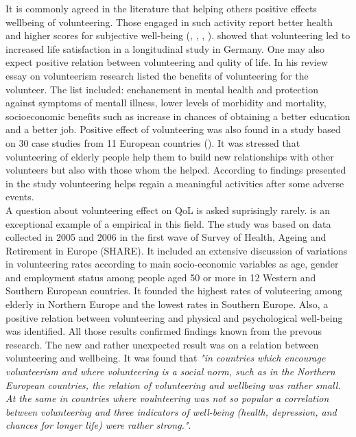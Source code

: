 \documentclass[10pt, letterpaper]{article}
\begin{document}
\begin{spacing}{1.4}
It is commonly agreed in the literature that helping others positive effects wellbeing of volunteering. Those engaged in such activity report better health and higher scores for subjective well-being (\citet{haski09}, \citet{morrow2003}, \citep{thoits03}, \citep{whillans2016}). \citep{meier08} showed that volunteering led to increased life satisfaction in a longitudinal study in Germany. One may also expect positive relation between volunteering and qulity of life.  In his review essay on volunteerism research \citet{wilson12} listed the benefits of volunteering for the volunteer. The list included: enchancment in mental health and protection against symptoms of mentall illness, lower levels of morbidity and mortality, socioeconomic benefits such as increase in chances of obtaining a better education and a better job. Positive effect of volunteering was also found in a study based on 30 case studies from 11 European countries (\citet{ehlers11}). It was stressed that volunteering of elderly people help them to build new relationships with other volunteers but also with those whom the helped. According to findings presented in the study volunteering helps regain a meaningful activities after some adverse events.   \\

A question about volunteering effect on QoL is asked suprisingly  rarely. \citet{haski09} is an exceptional example of a empirical in this field. The study was based on data collected in 2005 and 2006 in the first wave of Survey of Health, Ageing and Retirement in Europe (SHARE). It included an extensive discussion of variations in volunteering rates according to main socio-economic variables as age, gender and employment status among people aged 50 or more in 12 Western and Southern European countries. It founded  the highest rates of voluteering among elderly in Northern Europe and the lowest rates in Southern Europe. Also, a positive relation between volunteering and physical and psychological well-being was identified. All those results confirmed findings known from the prevous research. The new and rather unexpected result was on a relation between volunteering and wellbeing. It was found that \textit{"in countries which encourage volunteerism and where volunteering is a social norm, such as in the Northern European countries, the relation of volunteering and wellbeing was rather small. At the same in countries where voulnteering was not so popular  a correlation between volunteering and three indicators of well-being (health, depression, and chances for longer life) were rather strong."}.  \\


\end{spacing}
\end{document}
